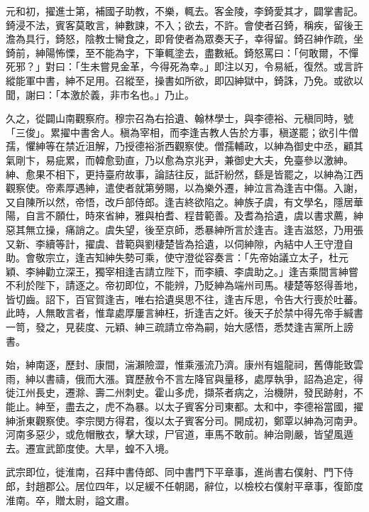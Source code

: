 \begin{pinyinscope}
 元和初，擢進士第，補國子助教，不樂，輒去。客金陵，李錡愛其才，闢掌書記。錡浸不法，賓客莫敢言，紳數諫，不入；欲去，不許。會使者召錡，稱疾，留後王澹為具行，錡怒，陰教士臠食之，即脅使者為眾奏天子，幸得留。錡召紳作疏，坐錡前，紳陽怖慄，至不能為字，下筆輒塗去，盡數紙。錡怒罵曰：「何敢爾，不憚死邪？」對曰：「生未嘗見金革，今得死為幸。」即注以刃，令易紙，復然。或言許縱能軍中書，紳不足用。召縱至，操書如所欲，即囚紳獄中，錡誅，乃免。或欲以聞，謝曰：「本激於義，非市名也。」乃止。



 久之，從闢山南觀察府。穆宗召為右拾遺、翰林學士，與李德裕、元稹同時，號「三俊」。累擢中書舍人。稹為宰相，而李逢吉教人告於方事，稹遂罷；欲引牛僧孺，懼紳等在禁近沮解，乃授德裕浙西觀察使。僧孺輔政，以紳為御史中丞，顧其氣剛卞，易疵累，而韓愈勁直，乃以愈為京兆尹，兼御史大夫，免臺參以激紳。紳、愈果不相下，更持臺府故事，論詰往反，詆訐紛然，繇是皆罷之，以紳為江西觀察使。帝素厚遇紳，遣使者就第勞賜，以為樂外遷，紳泣言為逢吉中傷。入謝，又自陳所以然，帝悟，改戶部侍郎。逢吉終欲陷之。紳族子虞，有文學名，隱居華陽，自言不願仕，時來省紳，雅與柏耆、程昔範善。及耆為拾遺，虞以書求薦，紳惡其無立操，痛誚之。虞失望，後至京師，悉暴紳所言於逢吉。逢吉滋怒，乃用張又新、李續等計，擢虞、昔範與劉棲楚皆為拾遺，以伺紳隙，內結中人王守澄自助。會敬宗立，逢吉知紳失勢可乘，使守澄從容奏言：「先帝始議立太子，杜元穎、李紳勸立深王，獨宰相逢吉請立陛下，而李續、李虞助之。」逢吉乘間言紳嘗不利於陛下，請逐之。帝初即位，不能辨，乃貶紳為端州司馬。棲楚等怒得善地，皆切齒。詔下，百官賀逢吉，唯右拾遺吳思不往，逢吉斥思，令告大行喪於吐蕃。此時，人無敢言者，惟韋處厚屢言紳枉，折逢吉之奸。後天子於禁中得先帝手緘書一笥，發之，見裴度、元穎、紳三疏請立帝為嗣，始大感悟，悉焚逢吉黨所上謗書。



 始，紳南逐，歷封、康間，湍瀨險澀，惟乘漲流乃濟。康州有媼龍祠，舊傳能致雲雨，紳以書禱，俄而大漲。寶歷赦令不言左降官與量移，處厚執爭，詔為追定，得徙江州長史，遷滁、壽二州刺史。霍山多虎，擷茶者病之，治機阱，發民跡射，不能止。紳至，盡去之，虎不為暴。以太子賓客分司東都。太和中，李德裕當國，擢紳浙東觀察使。李宗閔方得君，復以太子賓客分司。開成初，鄭覃以紳為河南尹。河南多惡少，或危帽散衣，擊大球，尸官道，車馬不敢前。紳治剛嚴，皆望風遁去。遷宣武節度使。大旱，蝗不入境。



 武宗即位，徙淮南，召拜中書侍郎、同中書門下平章事，進尚書右僕射、門下侍郎，封趙郡公。居位四年，以足緩不任朝謁，辭位，以檢校右僕射平章事，復節度淮南。卒，贈太尉，謚文肅。




\end{pinyinscope}
